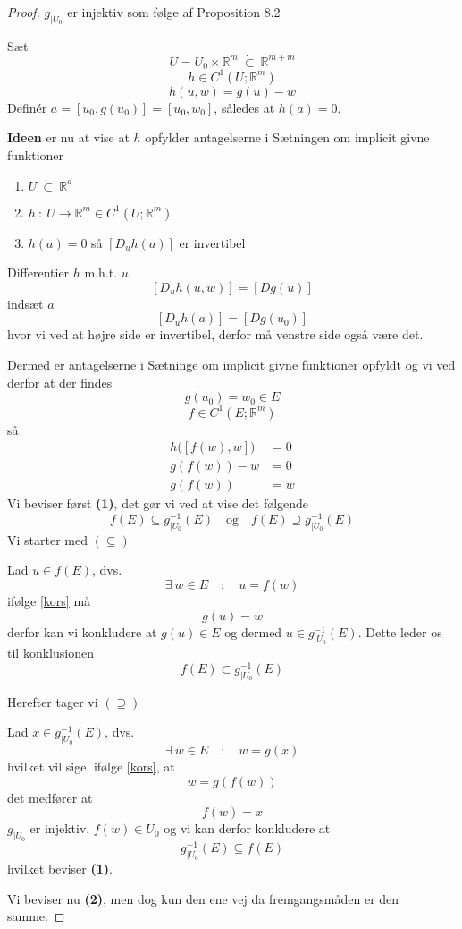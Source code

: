 \begin{proof}
  $g_{|U_0}$ er injektiv som følge af Proposition 8.2

  Sæt
  $$U = U_0 \times \mathbb{R}^m \ \dot{\subset} \ \mathbb{R}^{m + m}$$
  $$h \in C^1(U; \mathbb{R}^m)$$ $$h(u,w) = g(u) - w$$
  Definér $a = [u_0, g(u_0)] = [u_0, w_0]$, således at $h(a) = 0$.

  \textbf{Ideen} er nu at vise at $h$ opfylder antagelserne i Sætningen om implicit givne funktioner
  \begin{enumerate}[label = (\arabic*)]
    \item $U \ \dot{\subset} \ \mathbb{R}^d$
    \item $h \ : \ U \rightarrow \mathbb{R}^m \in C^1(U; \mathbb{R}^m)$
    \item $h(a) = 0$ så $[D_uh(a)]$ er invertibel
  \end{enumerate}
  Differentier $h$ m.h.t. $u$
  $$[D_uh(u,w)] = [Dg(u)]$$
  indsæt $a$
  $$[D_uh(a)] = [Dg(u_0)]$$
  hvor vi ved at højre side er invertibel, derfor må venstre side også være det.

  Dermed er antagelserne i Sætninge om implicit givne funktioner opfyldt og vi ved derfor at der findes
  $$g(u_0) = w_0 \in E$$
  $$f \in C^1(E; \mathbb{R}^m)$$
  så
  \begin{align}
    h \Big( [f(w), w] \Big) &= 0 \nonumber\\
    g(f(w)) - w &= 0 \nonumber\\
    g(f(w)) &= w \label{kors}
  \end{align}
  Vi beviser først \textbf{(1)}, det gør vi ved at vise det følgende
  $$f(E) \subseteq g^{-1}_{|U_0}(E)
  \quad \text{og} \quad
  f(E) \supseteq g^{-1}_{|U_0}(E)$$
  Vi starter med $(\subseteq)$

  Lad $u \in f(E)$, dvs.
  $$\exists \ w \in E \quad : \quad u = f(w)$$
  ifølge \eqref{kors} må
  $$g(u) = w$$
  derfor kan vi konkludere at $g(u) \in E$ og dermed $u \in g^{-1}_{|U_0}(E)$.
  Dette leder os til konklusionen
  $$f(E) \subset g^{-1}_{|U_0}(E)$$

  Herefter tager vi $(\supseteq)$

  Lad $x \in g^{-1}_{|U_0}(E)$, dvs.
  $$\exists \ w \in E \quad : \quad w = g(x)$$
  hvilket vil sige, ifølge \eqref{kors}, at
  $$w = g(f(w))$$
  det medfører at
  $$f(w) = x$$
  $g_{|U_0}$ er injektiv, $f(w) \in U_0$ og vi kan derfor konkludere at
  $$g^{-1}_{|U_0}(E) \subseteq f(E)$$
  hvilket beviser \textbf{(1)}.

  Vi beviser nu \textbf{(2)}, men dog kun den ene vej da fremgangsmåden er den samme.


\end{proof}
